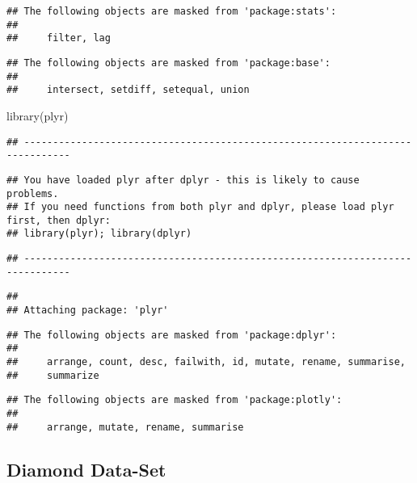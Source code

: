 \documentclass[
]{article}
\newenvironment{Shaded}{\begin{snugshade}}{\end{snugshade}}
\newcommand{\FunctionTok}[1]{\textcolor[rgb]{0.00,0.00,0.00}{#1}}
\newcommand{\NormalTok}[1]{#1}
\begin{document}
\begin{verbatim}
## The following objects are masked from 'package:stats':
## 
##     filter, lag
\end{verbatim}

\begin{verbatim}
## The following objects are masked from 'package:base':
## 
##     intersect, setdiff, setequal, union
\end{verbatim}

\begin{Shaded}
\begin{Highlighting}[]
\FunctionTok{library}\NormalTok{(plyr)}
\end{Highlighting}
\end{Shaded}

\begin{verbatim}
## ------------------------------------------------------------------------------
\end{verbatim}

\begin{verbatim}
## You have loaded plyr after dplyr - this is likely to cause problems.
## If you need functions from both plyr and dplyr, please load plyr first, then dplyr:
## library(plyr); library(dplyr)
\end{verbatim}

\begin{verbatim}
## ------------------------------------------------------------------------------
\end{verbatim}

\begin{verbatim}
## 
## Attaching package: 'plyr'
\end{verbatim}

\begin{verbatim}
## The following objects are masked from 'package:dplyr':
## 
##     arrange, count, desc, failwith, id, mutate, rename, summarise,
##     summarize
\end{verbatim}

\begin{verbatim}
## The following objects are masked from 'package:plotly':
## 
##     arrange, mutate, rename, summarise
\end{verbatim}

\hypertarget{diamond-data-set}{%
\subsection{Diamond Data-Set}\label{diamond-data-set}}
\end{document}
